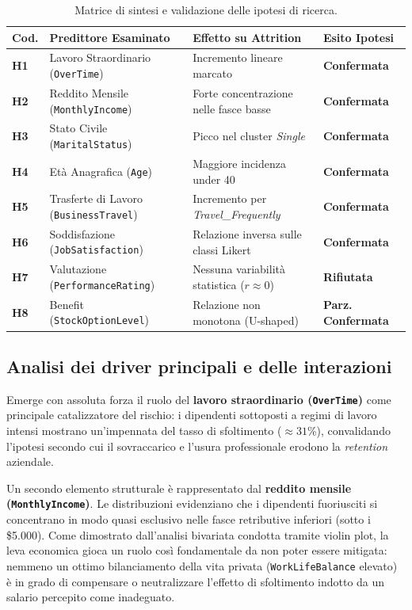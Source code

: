 \documentclass[11pt,a4paper]{article}
\begin{document}
\begin{table}[H]
\centering
\caption{Matrice di sintesi e validazione delle ipotesi di ricerca.}
\label{tab:sintesi_ipotesi}

\begin{tabularx}{\textwidth}{l l X l}
\hline
\textbf{Cod.} & \textbf{Predittore Esaminato} & \textbf{Effetto su Attrition} & \textbf{Esito Ipotesi} \\ 
\hline
\textbf{H1} & Lavoro Straordinario (\texttt{OverTime}) & Incremento lineare marcato & \textbf{Confermata} \\
\textbf{H2} & Reddito Mensile (\texttt{MonthlyIncome}) & Forte concentrazione nelle fasce basse & \textbf{Confermata} \\
\textbf{H3} & Stato Civile (\texttt{MaritalStatus}) & Picco nel cluster \textit{Single} & \textbf{Confermata} \\
\textbf{H4} & Età Anagrafica (\texttt{Age}) & Maggiore incidenza under 40 & \textbf{Confermata} \\
\textbf{H5} & Trasferte di Lavoro (\texttt{BusinessTravel}) & Incremento per \textit{Travel\_Frequently} & \textbf{Confermata} \\
\textbf{H6} & Soddisfazione (\texttt{JobSatisfaction}) & Relazione inversa sulle classi Likert & \textbf{Confermata} \\
\textbf{H7} & Valutazione (\texttt{PerformanceRating}) & Nessuna variabilità statistica ($r \approx 0$) & \textbf{Rifiutata} \\
\textbf{H8} & Benefit (\texttt{StockOptionLevel}) & Relazione non monotona (U-shaped) & \textbf{Parz. Confermata} \\
\hline
\end{tabularx}
\end{table}

\subsection{Analisi dei driver principali e delle interazioni}
Emerge con assoluta forza il ruolo del \textbf{lavoro straordinario (\texttt{OverTime})} come principale catalizzatore del rischio: i dipendenti sottoposti a regimi di lavoro intensi mostrano un'impennata del tasso di sfoltimento ($\approx 31\%$), convalidando l'ipotesi secondo cui il sovraccarico e l'usura professionale erodono la \textit{retention} aziendale.

Un secondo elemento strutturale è rappresentato dal \textbf{reddito mensile (\texttt{MonthlyIncome})}. Le distribuzioni evidenziano che i dipendenti fuoriusciti si concentrano in modo quasi esclusivo nelle fasce retributive inferiori (sotto i \$5.000). Come dimostrato dall'analisi bivariata condotta tramite violin plot, la leva economica gioca un ruolo così fondamentale da non poter essere mitigata: nemmeno un ottimo bilanciamento della vita privata (\texttt{WorkLifeBalance} elevato) è in grado di compensare o neutralizzare l'effetto di sfoltimento indotto da un salario percepito come inadeguato.
\end{document}
